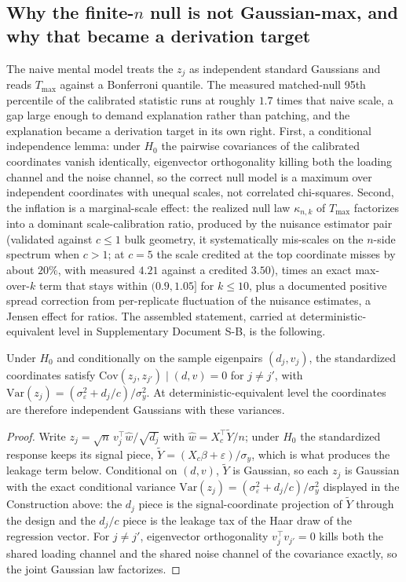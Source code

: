 \subsection{Why the finite-\texorpdfstring{$n$}{n} null is not Gaussian-max, and why that became a derivation target}

The naive mental model treats the $z_j$ as independent standard Gaussians and reads $T_{\max}$ against a Bonferroni quantile. The measured matched-null 95th percentile of the calibrated statistic runs at roughly $1.7$ times that naive scale, a gap large enough to demand explanation rather than patching, and the explanation became a derivation target in its own right. First, a conditional independence lemma: under $H_0$ the pairwise covariances of the calibrated coordinates vanish identically, eigenvector orthogonality killing both the loading channel and the noise channel, so the correct null model is a maximum over independent coordinates with unequal scales, not correlated chi-squares. Second, the inflation is a marginal-scale effect: the realized null law $\kappa_{n,k}$ of $T_{\max}$ factorizes into a dominant scale-calibration ratio, produced by the nuisance estimator pair (validated against $c\le 1$ bulk geometry, it systematically mis-scales on the $n$-side spectrum when $c>1$; at $c=5$ the scale credited at the top coordinate misses by about $20\%$, with measured $4.21$ against a credited $3.50$), times an exact max-over-$k$ term that stays within $(0.9,1.05]$ for $k\le 10$, plus a documented positive spread correction from per-replicate fluctuation of the nuisance estimates, a Jensen effect for ratios. The assembled statement, carried at deterministic-equivalent level in Supplementary Document S-B, is the following.

\begin{lemma}
\label{lem:condindep}
Under $H_0$ and conditionally on the sample eigenpairs $(d_j,v_j)$, the standardized coordinates satisfy
$\mathrm{Cov}(z_j,z_{j'})\mid (d,v)=0$ for $j\ne j'$, with $\mathrm{Var}(z_j)=(\sigma_\varepsilon^2+d_j/c)/\sigma_y^2$.
At deterministic-equivalent level the coordinates are therefore independent Gaussians with these variances.
\end{lemma}

\begin{proof}[Proof]
Write $z_j=\sqrt n\,v_j^\top \hat w/\sqrt{d_j}$ with $\hat w=X_c^\top\tilde Y/n$; under $H_0$ the standardized response keeps its signal piece, $\tilde Y=(X_c\beta+\varepsilon)/\sigma_y$, which is what produces the leakage term below. Conditional on $(d,v)$, $\tilde Y$ is Gaussian, so each $z_j$ is Gaussian with the exact conditional variance $\mathrm{Var}(z_j)=(\sigma_\varepsilon^2+d_j/c)/\sigma_y^2$ displayed in the Construction above: the $d_j$ piece is the signal-coordinate projection of $\tilde Y$ through the design and the $d_j/c$ piece is the leakage tax of the Haar draw of the regression vector. For $j\ne j'$, eigenvector orthogonality $v_j^\top v_{j'}=0$ kills both the shared loading channel and the shared noise channel of the covariance exactly, so the joint Gaussian law factorizes.
\end{proof}

